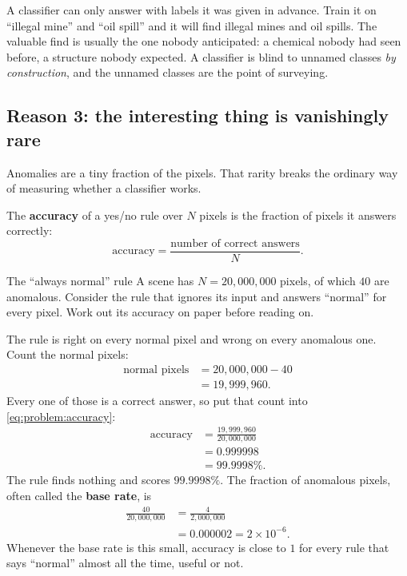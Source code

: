 A classifier can only answer with labels it was given in advance. Train it on ``illegal mine''
and ``oil spill'' and it will find illegal mines and oil spills. The valuable find is usually
the one nobody anticipated: a chemical nobody had seen before, a structure nobody expected. A
classifier is blind to unnamed classes \emph{by construction}, and the unnamed classes are the
point of surveying.

\subsection{Reason 3: the interesting thing is vanishingly rare}

Anomalies are a tiny fraction of the pixels. That rarity breaks the ordinary way of measuring
whether a classifier works.

\begin{definition}[Accuracy]
The \textbf{accuracy} of a yes/no rule over $N$ pixels is the fraction of pixels it answers
correctly:
\begin{equation}\label{eq:problem:accuracy}
\text{accuracy} = \frac{\text{number of correct answers}}{N}.
\end{equation}
\end{definition}

\begin{worked}[label={we:problem:accuracy}]{The ``always normal'' rule}
A scene has $N = 20{,}000{,}000$ pixels, of which $40$ are anomalous. Consider the rule that
ignores its input and answers ``normal'' for every pixel. Work out its accuracy on paper before
reading on.

The rule is right on every normal pixel and wrong on every anomalous one. Count the normal
pixels:
\begin{align*}
\text{normal pixels} &= 20{,}000{,}000 - 40\\
                     &= 19{,}999{,}960.
\end{align*}
Every one of those is a correct answer, so put that count into \cref{eq:problem:accuracy}:
\begin{align*}
\text{accuracy} &= \frac{19{,}999{,}960}{20{,}000{,}000}\\
                &= 0.999998\\
                &= 99.9998\%.
\end{align*}
The rule finds nothing and scores $99.9998\%$. The fraction of anomalous pixels, often called
the \textbf{base rate}, is
\begin{align*}
\frac{40}{20{,}000{,}000} &= \frac{4}{2{,}000{,}000}\\
                          &= 0.000002 = 2\times 10^{-6}.
\end{align*}
Whenever the base rate is this small, accuracy is close to $1$ for every rule that says
``normal'' almost all the time, useful or not.
\end{worked}

